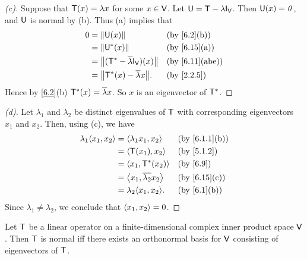 \begin{proof}[(c)]
	Suppose that \(\mathsf{T}(x) = \lambda x\) for some \(x \in \mathsf{V}\).
	Let \(\U = \T - \lambda \IT[\V]\).
	Then \(\mathsf{U}(x) = \mathit{0}\), and \(\mathsf{U}\) is normal by (b).
	Thus (a) implies that
	\begin{align*}
		0 & = \norm{\U(x)}                              &  & \by{6.2}[b]    \\
		  & = \norm{\U^*(x)}                            &  & \by{6.15}[a]   \\
		  & = \norm{(\T^* - \conj{\lambda} \IT[\V])(x)} &  & \by{6.11}[abe] \\
		  & = \norm{\T^*(x) - \conj{\lambda} x}.        &  & \by{2.2.5}
	\end{align*}
	Hence by \cref{6.2}(b) \(\mathsf{T}^*(x) = \overline{\lambda} x\).
	So \(x\) is an eigenvector of \(\mathsf{T}^*\).
\end{proof}

\begin{proof}[(d)]
	Let \(\lambda_1\) and \(\lambda_2\) be distinct eigenvalues of \(\mathsf{T}\) with corresponding eigenvectors \(x_1\) and \(x_2\).
	Then, using (c), we have
	\begin{align*}
		\lambda_1 \inn{x_1, x_2} & = \inn{\lambda_1 x_1, x_2}        &  & \by{6.1.1}[b] \\
		                         & = \inn{\T(x_1), x_2}              &  & \by{5.1.2}    \\
		                         & = \inn{x_1, \T^*(x_2)}            &  & \by{6.9}      \\
		                         & = \inn{x_1, \conj{\lambda_2} x_2} &  & \by{6.15}[c]  \\
		                         & = \lambda_2 \inn{x_1, x_2}.       &  & \by{6.1}[b]
	\end{align*}
	Since \(\lambda_1 \neq \lambda_2\), we conclude that \(\left\langle x_1, x_2\right\rangle = 0\).
\end{proof}

\begin{thm}\label{6.16}
	Let \(\mathsf{T}\) be a linear operator on a finite-dimensional complex inner product space \(\mathsf{V}\).
	Then \(\mathsf{T}\) is normal iff there exists an orthonormal basis for \(\mathsf{V}\) consisting of eigenvectors of \(\mathsf{T}\).
\end{thm}

